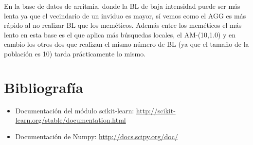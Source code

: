 \documentclass[10pt,a4paper]{article}
\begin{document}
En la base de datos de arritmia, donde la BL de baja intensidad puede ser más lenta ya que el vecindario de un inviduo es mayor, sí vemos como el AGG es más rápido al no realizar BL que los meméticos. Además entre los meméticos el más lento en esta base es el que aplica más búsquedas locales, el AM-(10,1.0) y en cambio los otros dos que realizan el mismo número de BL (ya que el tamaño de la población es 10) tarda prácticamente lo mismo.\\

\newpage
\section{\color[rgb]{0.0,0.0,0.21}Bibliografía}

\begin{itemize}
\item Documentación del módulo scikit-learn: \url{http://scikit-learn.org/stable/documentation.html}
\item Documentación de Numpy: \url{http://docs.scipy.org/doc/}
\end{itemize}
\end{document}
